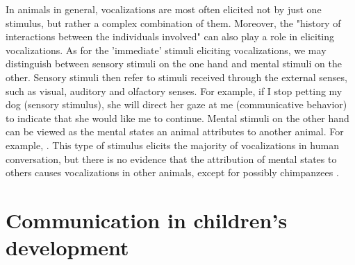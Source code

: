 In animals in general, vocalizations are most often elicited not by just one stimulus, but rather a complex combination of them. Moreover, the "history of interactions between the individuals involved" \citep[p.~151]{SeyfarthCheney03} can also play a role in eliciting vocalizations. As for the 'immediate' stimuli eliciting vocalizations, we may distinguish between sensory stimuli on the one hand and mental stimuli on the other. Sensory stimuli then refer to stimuli received through the external senses, such as visual, auditory and olfactory senses.
For example, if I stop petting my dog (sensory stimulus), she will direct her gaze at me (communicative behavior) to indicate that she would like me to continue.
Mental stimuli on the other hand can be viewed as the mental states an animal attributes to another animal.
For example, .
This type of stimulus elicits the majority of vocalizations in human conversation, but there is no evidence that the attribution of mental states to others causes vocalizations in other animals, except for possibly chimpanzees \citep{SeyfarthCheney03}.

\section{Communication in children's development}
\label{sec:comm:ontogeny}


